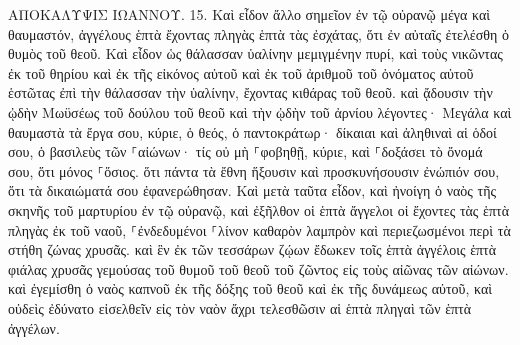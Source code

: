 \documentclass[twoside, 9pt]{extreport}
\begin{document}
ΑΠΟΚΑΛΥΨΙΣ ΙΩΑΝΝΟΥ.
15.
Καὶ εἶδον ἄλλο σημεῖον ἐν τῷ οὐρανῷ μέγα καὶ θαυμαστόν, ἀγγέλους ἑπτὰ ἔχοντας πληγὰς ἑπτὰ τὰς ἐσχάτας, ὅτι ἐν αὐταῖς ἐτελέσθη ὁ θυμὸς τοῦ θεοῦ. 
Καὶ εἶδον ὡς θάλασσαν ὑαλίνην μεμιγμένην πυρί, καὶ τοὺς νικῶντας ἐκ τοῦ θηρίου καὶ ἐκ τῆς εἰκόνος αὐτοῦ καὶ ἐκ τοῦ ἀριθμοῦ τοῦ ὀνόματος αὐτοῦ ἑστῶτας ἐπὶ τὴν θάλασσαν τὴν ὑαλίνην, ἔχοντας κιθάρας τοῦ θεοῦ. 
καὶ ᾄδουσιν τὴν ᾠδὴν Μωϋσέως τοῦ δούλου τοῦ θεοῦ καὶ τὴν ᾠδὴν τοῦ ἀρνίου λέγοντες· Μεγάλα καὶ θαυμαστὰ τὰ ἔργα σου, κύριε, ὁ θεός, ὁ παντοκράτωρ· δίκαιαι καὶ ἀληθιναὶ αἱ ὁδοί σου, ὁ βασιλεὺς τῶν ⸀αἰώνων· 
τίς οὐ μὴ ⸀φοβηθῇ, κύριε, καὶ ⸀δοξάσει τὸ ὄνομά σου, ὅτι μόνος ⸀ὅσιος. ὅτι πάντα τὰ ἔθνη ἥξουσιν καὶ προσκυνήσουσιν ἐνώπιόν σου, ὅτι τὰ δικαιώματά σου ἐφανερώθησαν. 
Καὶ μετὰ ταῦτα εἶδον, καὶ ἠνοίγη ὁ ναὸς τῆς σκηνῆς τοῦ μαρτυρίου ἐν τῷ οὐρανῷ, 
καὶ ἐξῆλθον οἱ ἑπτὰ ἄγγελοι οἱ ἔχοντες τὰς ἑπτὰ πληγὰς ἐκ τοῦ ναοῦ, ⸀ἐνδεδυμένοι ⸀λίνον καθαρὸν λαμπρὸν καὶ περιεζωσμένοι περὶ τὰ στήθη ζώνας χρυσᾶς. 
καὶ ἓν ἐκ τῶν τεσσάρων ζῴων ἔδωκεν τοῖς ἑπτὰ ἀγγέλοις ἑπτὰ φιάλας χρυσᾶς γεμούσας τοῦ θυμοῦ τοῦ θεοῦ τοῦ ζῶντος εἰς τοὺς αἰῶνας τῶν αἰώνων. 
καὶ ἐγεμίσθη ὁ ναὸς καπνοῦ ἐκ τῆς δόξης τοῦ θεοῦ καὶ ἐκ τῆς δυνάμεως αὐτοῦ, καὶ οὐδεὶς ἐδύνατο εἰσελθεῖν εἰς τὸν ναὸν ἄχρι τελεσθῶσιν αἱ ἑπτὰ πληγαὶ τῶν ἑπτὰ ἀγγέλων. 
\end{document}
